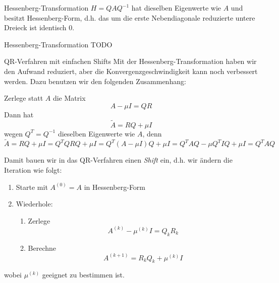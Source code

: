 \begin{defi}{Hessenberg-Transformation}
    $H = Q A Q^{-1}$ hat dieselben Eigenwerte wie $A$ und besitzt Hessenberg-Form, d.h. das um die erste Nebendiagonale reduzierte untere Dreieck ist identisch $0$.
\end{defi}

\begin{example}{Hessenberg-Transformation}
    TODO
\end{example}

\begin{defi}{QR-Verfahren mit einfachen Shifts}
    Mit der Hessenberg-Transformation haben wir den Aufwand reduziert, aber die Konvergenzgeschwindigkeit kann noch verbessert werden.
    Dazu benutzen wir den folgenden Zusammenhang:

    Zerlege statt $A$ die Matrix
    \[
        A - \mu I = QR
    \]
    Dann hat
    \[
        \tilde{A} = RQ + \mu I
    \]
    wegen $Q^T = Q^{-1}$ dieselben Eigenwerte wie $A$, denn
    \[
        \tilde{A} = RQ + \mu I = Q^T Q R Q + \mu I = Q^T (A - \mu I) Q + \mu I = Q^T A Q - \mu Q^T I Q + \mu I =  Q^T A Q
    \]

    Damit bauen wir in das QR-Verfahren einen \emph{Shift} ein, d.h. wir ändern die Iteration wie folgt:
    \begin{enumerate}
        \item Starte mit $A^{(0)} = A$ in Hessenberg-Form
        \item Wiederhole:
              \begin{enumerate}
                  \item Zerlege
                        \[
                            A^{(k)} - \mu^{(k)} I = Q_k R_k
                        \]
                  \item Berechne
                        \[
                            A^{(k+1)} = R_k Q_k + \mu^{(k)} I
                        \]
              \end{enumerate}
    \end{enumerate}
    wobei $\mu^{(k)}$ geeignet zu bestimmen ist.


\end{defi}
